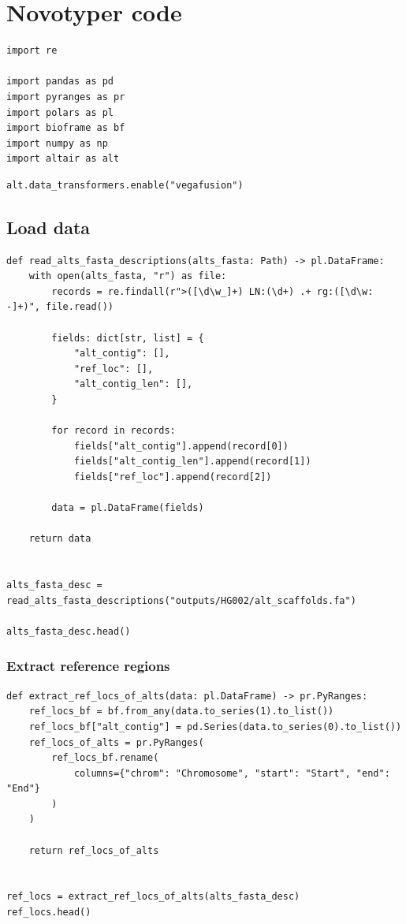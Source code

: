 \documentclass{article}
\begin{document}
\section{Novotyper code}

\begin{verbatim}
import re

import pandas as pd
import pyranges as pr
import polars as pl
import bioframe as bf
import numpy as np
import altair as alt
\end{verbatim}

\begin{verbatim}
alt.data_transformers.enable("vegafusion")
\end{verbatim}

\subsection{Load data}

\begin{verbatim}
def read_alts_fasta_descriptions(alts_fasta: Path) -> pl.DataFrame:
    with open(alts_fasta, "r") as file:
        records = re.findall(r">([\d\w_]+) LN:(\d+) .+ rg:([\d\w: -]+)", file.read())

        fields: dict[str, list] = {
            "alt_contig": [],
            "ref_loc": [],
            "alt_contig_len": [],
        }

        for record in records:
            fields["alt_contig"].append(record[0])
            fields["alt_contig_len"].append(record[1])
            fields["ref_loc"].append(record[2])

        data = pl.DataFrame(fields)

    return data


alts_fasta_desc = read_alts_fasta_descriptions("outputs/HG002/alt_scaffolds.fa")

alts_fasta_desc.head()
\end{verbatim}

\subsubsection{Extract reference regions}

\begin{verbatim}
def extract_ref_locs_of_alts(data: pl.DataFrame) -> pr.PyRanges:
    ref_locs_bf = bf.from_any(data.to_series(1).to_list())
    ref_locs_bf["alt_contig"] = pd.Series(data.to_series(0).to_list())
    ref_locs_of_alts = pr.PyRanges(
        ref_locs_bf.rename(
            columns={"chrom": "Chromosome", "start": "Start", "end": "End"}
        )
    )

    return ref_locs_of_alts


ref_locs = extract_ref_locs_of_alts(alts_fasta_desc)
ref_locs.head()
\end{verbatim}
\end{document}
